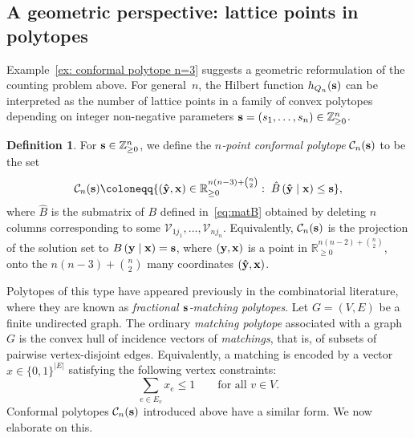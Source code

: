 \documentclass[12pt,a4paper]{extarticle}
\theoremstyle{definition}
\newtheorem{definition}[theorem]{Definition}
\newcommand{\R}{\mathbb{R}}
\begin{document}
\subsection{A geometric perspective: lattice points in polytopes}\label{per: geo}
Example~\ref{ex: conformal polytope n=3} suggests a geometric reformulation of the counting problem above.
For general~$n$, the Hilbert function $h_{Q_n}({\bf s})$ can be interpreted as the number of
lattice points in a family of convex polytopes depending on integer non-negative parameters 
${\bf s}=(s_1,\ldots,s_n)\in\mathbb{Z}_{\ge0}^n$.
\begin{definition} \label{def: conformal polytope}
For ${\bf s}\in\mathbb{Z}_{\ge0}^n$, we define the \emph{$n$‑point conformal polytope}
$\mathcal{C}_n({\bf s})$ to be the set 
\begin{equation} \label{eq: conformal polytope}
    \mathcal{C}_n({\bf s}) \coloneqq \{({\bf \hat{y}}, {\bf x}) \in \R_{\ge 0}^{n(n-3) + {n \choose 2}}: \; \hat{B}\,({\bf \hat{y}}\mid{\bf x})\le {\bf s}\},
\end{equation}
where $\hat{B}$ is the submatrix of $B$ defined in~\eqref{eq:matB} obtained by deleting $n$ columns corresponding to some $\mathcal{V}_{1j_1}, \ldots, \mathcal{V}_{nj_n}$. 
Equivalently,
$\mathcal{C}_n({\bf s})$ is the projection of the solution set to $B\,({\bf y}\mid {\bf x}) ={\bf s}$, where $({\bf y}, {\bf x})$ is a point in $ \R_{\ge 0}^{n(n-2) + {n \choose 2}}$, 
onto the $n(n-3) + {n \choose 2}$ many coordinates $({\bf \hat{y}}, {\bf x})$.
\end{definition}
Polytopes of this type have appeared previously in the combinatorial literature,
where they are known as \emph{fractional ${\bf s}$‑matching polytopes}. Let $G=(V,E)$ be a finite undirected graph. The ordinary \emph{matching polytope} associated with a graph $G$ is the convex hull of incidence vectors of \emph{matchings}, that is, of subsets of pairwise vertex-disjoint edges. Equivalently, a matching is encoded by a vector $x\in\{0,1\}^{|E|}$ satisfying the following vertex constraints:
$$
\sum_{e\in E_v}x_e\leq 1
\qquad\text{for all }v\in V.
$$ 
Conformal polytopes $\mathcal{C}_n({\bf s })$ introduced above have a similar form. We now elaborate on this. 

\medskip
\end{document}
